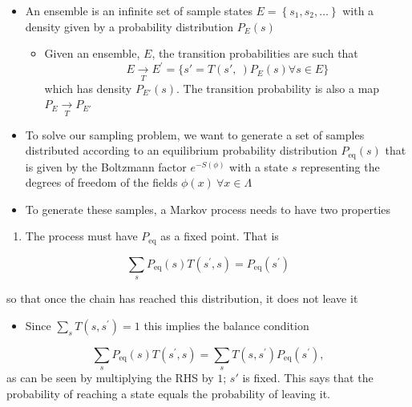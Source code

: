 \begin{itemize}
  \item An ensemble is an infinite set of sample states \(E=\left\{s_{1}, s_{2}, \ldots\right\}\) with a density given by a probability distribution \(P_{E}(s)\)
  \begin{itemize}
      \item Given an ensemble, $E$, the transition probabilities are such that 
      \begin{equation}
          E \underset{T}{\rightarrow} E^\prime=\{s'=T(s',\ )P_E(s) \forall s \in E \}
      \end{equation} 
      which has density $P_{E'}(s)$. The transition probability is also a map $P_E \underset{T}{\rightarrow}P_{E'}$
  \end{itemize}
\end{itemize}

\begin{itemize}
  \item To solve our sampling problem, we want to generate a set of samples distributed according to an equilibrium probability distribution $P_\text{eq}(s)$ that is given by the Boltzmann factor $e^{-S(\phi)}$ with a state $s$ representing the degrees of freedom of the fields $\phi(x) \:\forall x \in \Lambda$
  \item To generate these samples, a Markov process needs to have two properties
\end{itemize}
\begin{enumerate}
  \item The process must have \(P_{\text{eq}}\) as a fixed point. That is
\end{enumerate}

\begin{equation}
\sum_{s} P_{\text{eq}}(s) T\left(s^{\prime}, s\right)=P_{\text{eq}}\left(s^{\prime}\right)
\end{equation}

so that once the chain has reached this distribution, it does not leave it

\begin{itemize}
  \item Since \(\sum_{s} T\left(s, s^{\prime}\right)=1\) this implies the balance condition
\end{itemize}

\begin{equation}
\sum_{s} P_{\text{eq}}(s) T\left(s^{\prime}, s\right)=\sum_{s} T\left(s, s^{\prime}\right) P_{\text{eq}}\left(s^{\prime}\right),
\end{equation}
as can be seen by multiplying the RHS by $1$; $s'$ is fixed. This says that the probability of reaching a state equals the probability of leaving it.

